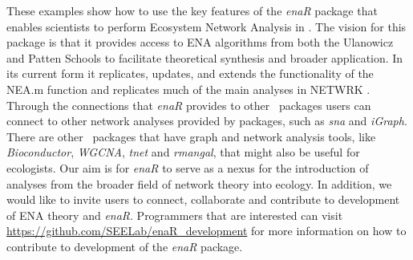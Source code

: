 \documentclass[article]{jss}
\newcommand{\R}{\proglang{R}}
\begin{document}
These examples show how to use the key features of the \textit{enaR}
package that enables scientists to perform Ecosystem Network Analysis
in \R.  The vision for this package is that it provides access to ENA
algorithms from both the Ulanowicz and Patten Schools to facilitate
theoretical synthesis and broader application.  In its current form it
replicates, updates, and extends the functionality of the NEA.m
function \citep{fath06} and replicates much of the main analyses in NETWRK
\citep{ulanowicz91}.  Through the connections that \textit{enaR}
provides to other \R\ packages users can connect to other network
analyses provided by packages, such as \textit{sna} and
\textit{iGraph}. There are other \R\ packages that have graph and
network analysis tools, like \textit{Bioconductor}, \textit{WGCNA},
\textit{tnet} and \textit{rmangal}, that might also be useful for
ecologists.  Our aim is for \textit{enaR} to serve as a nexus for the
introduction of analyses from the broader field of network theory into
ecology. In addition, we would like to invite users to connect,
collaborate and contribute to development of ENA theory and
\textit{enaR}. Programmers that are interested can visit
\url{https://github.com/SEELab/enaR_development} for more information
on how to contribute to development of the \textit{enaR} package.


\end{document}
